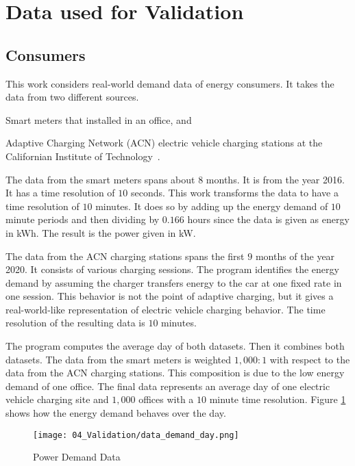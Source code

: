\section{Data used for Validation}
\label{evaluation:data}

\subsection{Consumers}

This work considers real-world demand data of energy consumers.
It takes the data from two different sources.
\begin{enumerate*}[label=(\roman*)]
  \item Smart meters that \citeauthor{Georgievski2012} installed in an office, and
  \item Adaptive Charging Network (ACN) electric vehicle charging stations at the Californian Institute of Technology~\cite{Lee2019, ACNCaltech2020}.
\end{enumerate*}

The data from the smart meters spans about $8$ months.
It is from the year 2016.
It has a time resolution of $10$ seconds.
This work transforms the data to have a time resolution of $10$ minutes.
It does so by adding up the energy demand of $10$ minute periods and then dividing by $0.166$ hours since the data is given as energy in kWh.
The result is the power given in kW.

The data from the ACN charging stations spans the first $9$ months of the year 2020.
It consists of various charging sessions.
The program identifies the energy demand by assuming the charger transfers energy to the car at one fixed rate in one session.
This behavior is not the point of adaptive charging, but it gives a real-world-like representation of electric vehicle charging behavior.
The time resolution of the resulting data is $10$ minutes.

The program computes the average day of both datasets.
Then it combines both datasets.
The data from the smart meters is weighted $1, 000 : 1$ with respect to the data from the ACN charging stations.
This composition is due to the low energy demand of one office.
The final data represents an average day of one electric vehicle charging site and $1, 000$ offices with a $10$ minute time resolution.
Figure \ref{figure:data.demand.day} shows how the energy demand behaves over the day.

\begin{figure}
  \centering
  \texttt{[image: 04\_Validation/data\_demand\_day.png]}
  \caption{Power Demand Data}
  \label{figure:data.demand.day}
\end{figure}

